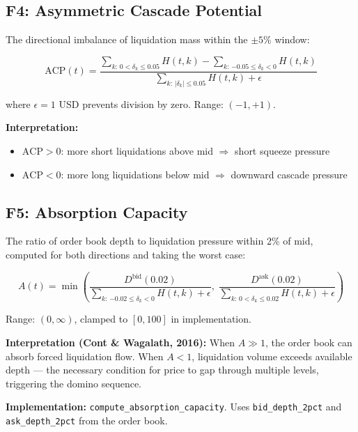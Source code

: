 \documentclass[11pt,a4paper]{article}
\begin{document}
\subsection{F4: Asymmetric Cascade Potential}

The directional imbalance of liquidation mass within the $\pm 5\%$ window:

\begin{equation}
\text{ACP}(t) = \frac{\displaystyle\sum_{k:\, 0 < \delta_k \leq 0.05} H(t,k) - \displaystyle\sum_{k:\, {-0.05} \leq \delta_k < 0} H(t,k)}{\displaystyle\sum_{k:\, |\delta_k| \leq 0.05} H(t,k) + \epsilon}
\end{equation}

where $\epsilon = 1$ USD prevents division by zero. Range: $(-1, +1)$.

\textbf{Interpretation:}
\begin{itemize}
    \item $\text{ACP} > 0$: more short liquidations above mid $\Rightarrow$ short squeeze pressure
    \item $\text{ACP} < 0$: more long liquidations below mid $\Rightarrow$ downward cascade pressure
\end{itemize}

\subsection{F5: Absorption Capacity}

The ratio of order book depth to liquidation pressure within 2\% of mid, computed for both directions and taking the worst case:

\begin{equation}
A(t) = \min\!\left(\frac{D^{\text{bid}}(0.02)}{\displaystyle\sum_{k:\, {-0.02} \leq \delta_k < 0} H(t,k) + \epsilon},\; \frac{D^{\text{ask}}(0.02)}{\displaystyle\sum_{k:\, 0 < \delta_k \leq 0.02} H(t,k) + \epsilon}\right)
\end{equation}

Range: $(0, \infty)$, clamped to $[0, 100]$ in implementation.

\textbf{Interpretation (Cont \& Wagalath, 2016):} When $A \gg 1$, the order book can absorb forced liquidation flow. When $A < 1$, liquidation volume exceeds available depth --- the necessary condition for price to gap through multiple levels, triggering the domino sequence.

\textbf{Implementation:} \texttt{compute\_absorption\_capacity}. Uses \texttt{bid\_depth\_2pct} and \texttt{ask\_depth\_2pct} from the order book.
\end{document}
